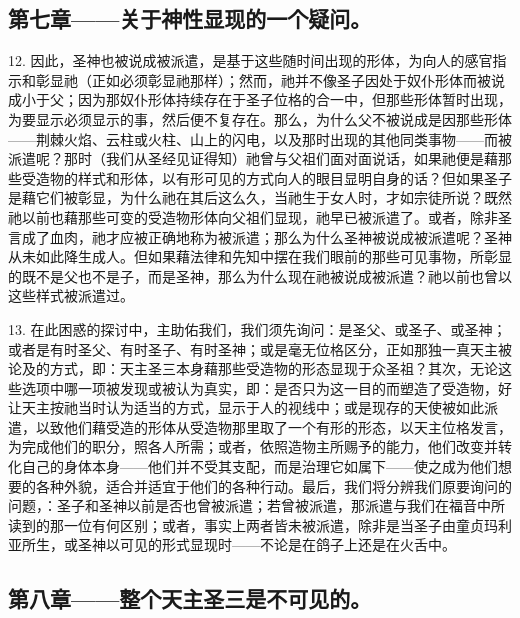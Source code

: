 
\subsection{第七章——关于神性显现的一个疑问。}

12. 因此，圣神也被说成被派遣，是基于这些随时间出现的形体，为向人的感官指示和彰显祂（正如必须彰显祂那样）；然而，祂并不像圣子因处于奴仆形体而被说成小于父；因为那奴仆形体持续存在于圣子位格的合一中，但那些形体暂时出现，为要显示必须显示的事，然后便不复存在。那么，为什么父不被说成是因那些形体——荆棘火焰、云柱或火柱、山上的闪电，以及那时出现的其他同类事物——而被派遣呢？那时（我们从圣经见证得知）祂曾与父祖们面对面说话，如果祂便是藉那些受造物的样式和形体，以有形可见的方式向人的眼目显明自身的话？但如果圣子是藉它们被彰显，为什么祂在其后这么久，当祂生于女人时，才如宗徒所说？既然祂以前也藉那些可变的受造物形体向父祖们显现，祂早已被派遣了。或者，除非圣言成了血肉，祂才应被正确地称为被派遣；那么为什么圣神被说成被派遣呢？圣神从未如此降生成人。但如果藉法律和先知中摆在我们眼前的那些可见事物，所彰显的既不是父也不是子，而是圣神，那么为什么现在祂被说成被派遣？祂以前也曾以这些样式被派遣过。\par

13. 在此困惑的探讨中，主助佑我们，我们须先询问：是圣父、或圣子、或圣神；或者是有时圣父、有时圣子、有时圣神；或是毫无位格区分，正如那独一真天主被论及的方式，即：天主圣三本身藉那些受造物的形态显现于众圣祖？其次，无论这些选项中哪一项被发现或被认为真实，即：是否只为这一目的而塑造了受造物，好让天主按祂当时认为适当的方式，显示于人的视线中；或是现存的天使被如此派遣，以致他们藉受造的形体从受造物那里取了一个有形的形态，以天主位格发言，为完成他们的职分，照各人所需；或者，依照造物主所赐予的能力，他们改变并转化自己的身体本身——他们并不受其支配，而是治理它如属下——使之成为他们想要的各种外貌，适合并适宜于他们的各种行动。最后，我们将分辨我们原要询问的问题，：圣子和圣神以前是否也曾被派遣；若曾被派遣，那派遣与我们在福音中所读到的那一位有何区别；或者，事实上两者皆未被派遣，除非是当圣子由童贞玛利亚所生，或圣神以可见的形式显现时——不论是在鸽子上还是在火舌中。\par


\subsection{第八章——整个天主圣三是不可见的。}

